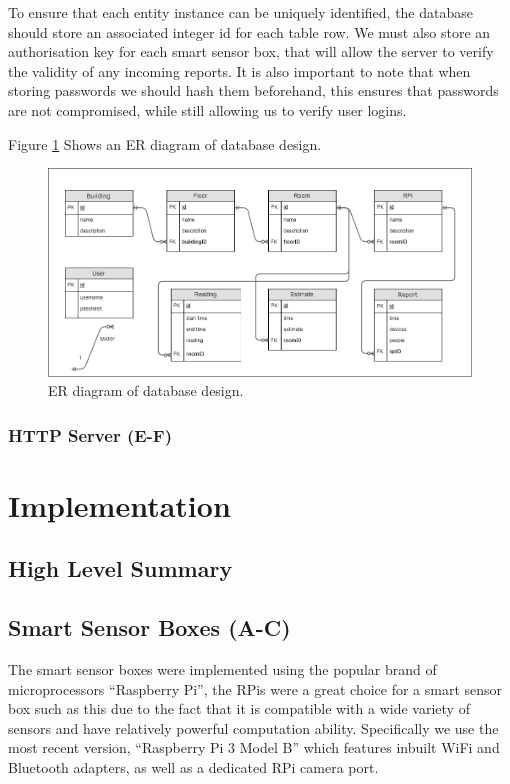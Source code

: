 \documentclass{l4proj}
\begin{document}
To ensure that each entity instance can be uniquely identified, the database should store an associated integer id for each table row.
We must also store an authorisation key for each smart sensor box, that will allow the server to verify the validity of any incoming reports.
It is also important to note that when storing passwords we should hash them beforehand, this ensures that passwords are not compromised, while still allowing us to verify user logins.

Figure \ref{fig:ERdiagram} Shows an ER diagram of database design.
\begin{figure}
\centering
\includegraphics[width=\textwidth]{ERdiagram}
\caption{ER diagram of database design.}
\label{fig:ERdiagram}
\end{figure}



\subsection{HTTP Server (E-F)}




\chapter{Implementation}


\section{High Level Summary}
\section{Smart Sensor Boxes (A-C)}
The smart sensor boxes were implemented using the popular brand of microprocessors “Raspberry Pi”, the RPis were a great choice for a smart sensor box such as this due to the fact that it is compatible with a wide variety of sensors and have relatively powerful computation ability. Specifically we use the most recent version, “Raspberry Pi 3 Model B” which features inbuilt WiFi and Bluetooth adapters, as well as a dedicated RPi camera port.
\end{document}

